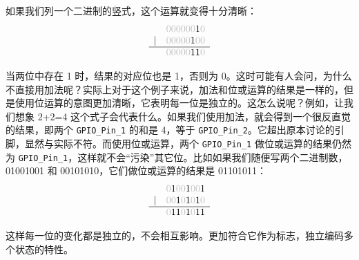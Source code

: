 \begin{itemize}
          如果我们列一个二进制的竖式，这个运算就变得十分清晰：
          \[
              \begin{array}{cc}
                      & \color{lightgray}000000{\color{black}1}0 \\
                  {|} & \color{lightgray}00000{\color{black}1}00 \\
                  \hline
                      & \color{lightgray}00000{\color{black}11}0
              \end{array}
          \]

          当两位中存在 1 时，结果的对应位也是 1，否则为 0。这时可能有人会问，为什么不直接用加法呢？实际上对于这个例子来说，加法和位或运算的结果是一样的，但是使用位运算的意图更加清晰，它表明每一位是独立的。这怎么说呢？例如，让我们想象 2+2=4 这个式子会代表什么。如果我们使用加法，就会得到一个很反直觉的结果，即两个 \texttt{GPIO\_Pin\_1} 的和是 4，等于 \texttt{GPIO\_Pin\_2}。它超出原本讨论的引脚，显然与实际不符。而使用位或运算，两个 \texttt{GPIO\_Pin\_1} 做位或运算的结果仍然为 \texttt{GPIO\_Pin\_1}，这样就不会“污染”其它位。比如如果我们随便写两个二进制数，01001001 和 00101010，它们做位或运算的结果是 01101011：
          \[
              \begin{array}{cc}
                      & \color{lightgray}0{\color{black}1}00{\color{black}1}00{\color{black}1} \\
                  {|} & \color{lightgray}00{\color{black}1}0{\color{black}1}0{\color{black}1}0 \\
                  \hline
                      & \color{lightgray}0{\color{black}11}0{\color{black}1}0{\color{black}11}
              \end{array}
          \]

          这样每一位的变化都是独立的，不会相互影响。更加符合它作为标志，独立编码多个状态的特性。


\end{itemize}
